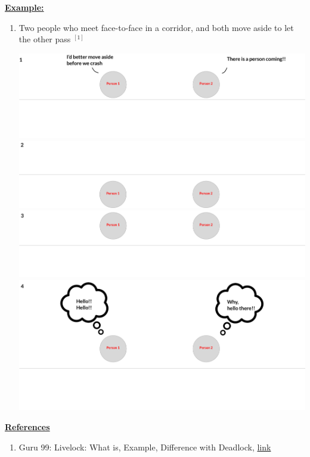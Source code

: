 \documentclass[12pt]{article}
\begin{document}
\begin{itemize}
\begin{itemize}
        \bigskip

        \underline{\textbf{Example:}}

        \bigskip

        \begin{enumerate}[1.]
            \item Two people who meet face-to-face in a corridor, and both move
            aside to let the other pass $^{[1]}$

            \begin{center}
                \includegraphics[width=\linewidth]{../images/week_10_notes_1_5.png}
                \includegraphics[width=\linewidth]{../images/week_10_notes_1_6.png}
                \includegraphics[width=\linewidth]{../images/week_10_notes_1_7.png}
                \includegraphics[width=\linewidth]{../images/week_10_notes_1_8.png}
            \end{center}
        \end{enumerate}
    \end{itemize}

    \bigskip

    \underline{\textbf{References}}

    \bigskip

    \begin{enumerate}[1)]
        \item Guru 99: Livelock: What is, Example, Difference with Deadlock, \href{https://www.guru99.com/what-is-livelock-example.html}{link}
    \end{enumerate}
\end{itemize}
\end{document}
